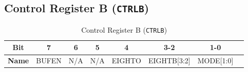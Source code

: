   \subsection{Control Register B (\texttt{CTRLB})}
  \label{sec:ctrlb}
  
  \begin{table}[H]
      \centering
      \caption{Control Register B (\texttt{CTRLB})}
      \begin{tabular}{@{}cccccccc@{}}
          \toprule
          \textbf{Bit} & 7 & 6 & 5 & 4 & 3-2 & 1-0 \\ \midrule
          \textbf{Name} & BUFEN & N/A & N/A & EIGHTO & EIGHTB[3:2] & MODE[1:0] \\ \bottomrule
      \end{tabular}
      \label{tab:ctrl_b}
  \end{table}
  
